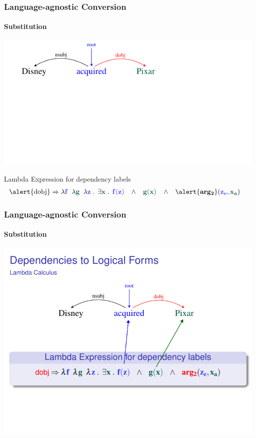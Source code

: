\documentclass[mathserif,12pt]{beamer}
\newcommand{\hlight}[1]{{\color{blue!80} #1}}
\renewcommand{\land}{\wedge}
\newcommand{\lspace}{.\,}
\begin{document}
\begin{frame}
\frametitle{Language-agnostic Conversion}
\framesubtitle{Substitution}
\vspace{-2.4em}
\begin{center}
\includegraphics[trim=2em 9.4em 10em 0em,clip=true,scale=1.3]{figures/pixar_dobj}

\end{center}

\vspace{1cm}

\begin{block}{\centering Lambda Expression for dependency labels}
\vspace{-0.5cm}
\begin{align*}
  \hbox{\alert{dobj}} & \Rightarrow  \lambda \hlight{\mathbf{f}}\;\; \lambda {\color{blue!40!green!60!black} \mathbf{g}}\;\; \lambda \hlight{\mathbf{z}}\; \lspace \; \exists {\color{blue!40!green!60!black} \mathbf{x}}\; \lspace \; \hlight{\mathbf{f(z)}}\;\;\; \land \;\;\; {\color{blue!40!green!60!black} \mathbf{g(x)}}  \;\;\; \land\;\;\; \alert{\mathbf{arg_2}}(\hlight{\mathbf{z_e}}, {\color{blue!40!green!60!black} \mathbf{x_a}})
\end{align*}
\vspace{-0.5cm}
\end{block}
\end{frame}

\begin{frame}
\frametitle{Language-agnostic Conversion}
\framesubtitle{Substitution}
\vspace{2em}
\includegraphics[trim=1em 0em 0em 4em,clip=true,scale=1]{figures/dobj-lambda-calculus}
\end{frame} 
\end{document}
